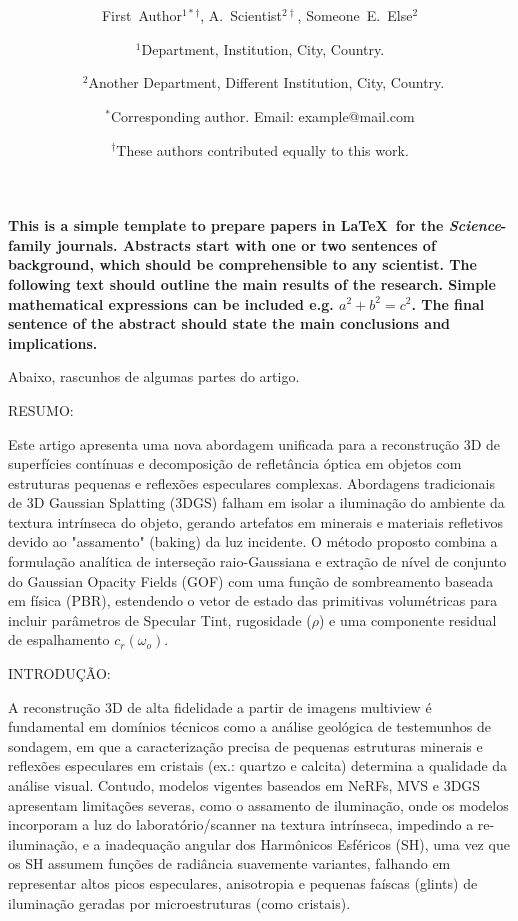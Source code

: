 \documentclass[12pt]{article}
\date{}
\title{\bfseries \boldmath \scititle}
\author{
	First~Author$^{1\ast\dagger}$,
	A.~Scientist$^{2\dagger}$,
	Someone~E.~Else$^{2}$\and
	\small$^{1}$Department, Institution, City, Country.\and\
	\small$^{2}$Another Department, Different Institution, City, Country.\and
	\small$^\ast$Corresponding author. Email: example@mail.com\and
	\small$^\dagger$These authors contributed equally to this work.
}
\renewenvironment{abstract}
	{\quotation}
	{\endquotation}
\begin{document}
 

\maketitle

\begin{abstract} \bfseries \boldmath
This is a simple template to prepare papers in \LaTeX\ for the \textit{Science}-family journals.
Abstracts start with one or two sentences of background, which should be
comprehensible to any scientist.
The following text should outline the main results of the research.
Simple mathematical expressions can be included e.g. $a^2+b^2=c^2$.
The final sentence of the abstract should state the main conclusions and implications.
\end{abstract}


\noindent

Abaixo, rascunhos de algumas partes do artigo.

RESUMO:

Este artigo apresenta uma nova abordagem unificada para a reconstrução 3D de superfícies contínuas e decomposição de refletância óptica em objetos com estruturas pequenas e reflexões especulares complexas. Abordagens tradicionais de 3D Gaussian Splatting (3DGS) falham em isolar a iluminação do ambiente da textura intrínseca do objeto, gerando artefatos em minerais e materiais refletivos devido ao "assamento" (baking) da luz incidente. O método proposto combina a formulação analítica de interseção raio-Gaussiana e extração de nível de conjunto do Gaussian Opacity Fields (GOF) com uma função de sombreamento baseada em física (PBR), estendendo o vetor de estado das primitivas volumétricas para incluir parâmetros de Specular Tint, rugosidade ($\rho$) e uma componente residual de espalhamento $c_r(\omega_o)$.

INTRODUÇÃO:

A reconstrução 3D de alta fidelidade a partir de imagens multiview é fundamental em domínios técnicos como a análise geológica de testemunhos de sondagem, em que a caracterização precisa de pequenas estruturas minerais e reflexões especulares em cristais (ex.: quartzo e calcita) determina a qualidade da análise visual. Contudo, modelos vigentes baseados em NeRFs, MVS e 3DGS apresentam limitações severas, como o assamento de iluminação, onde os modelos incorporam a luz do laboratório/scanner na textura intrínseca, impedindo a re-iluminação, e a inadequação angular dos Harmônicos Esféricos (SH), uma vez que os SH assumem funções de radiância suavemente variantes, falhando em representar altos picos especulares, anisotropia e pequenas faíscas (glints) de iluminação geradas por microestruturas (como cristais).
\end{document}
